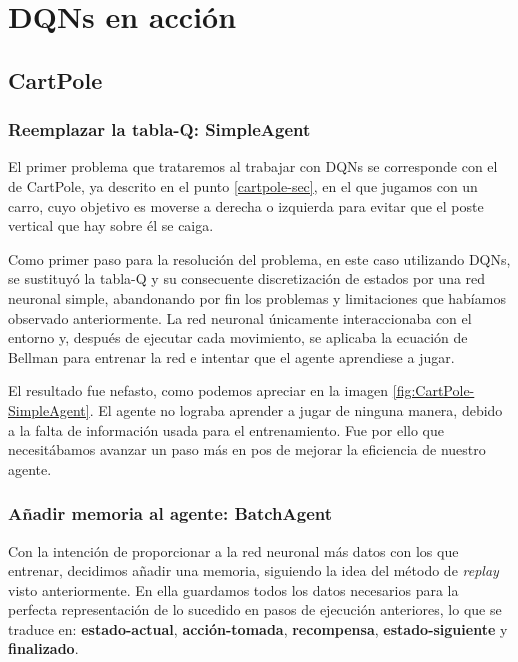 \chapter{DQNs en acción}
\label{cap:dqnEnAccion}


\section{CartPole}
\label{sec:cartpoleDQN}

\subsection{Reemplazar la tabla-Q: SimpleAgent}

El primer problema que trataremos al trabajar con DQNs se corresponde con el de CartPole, ya descrito en el punto \ref{cartpole-sec}, en el que jugamos con un carro, cuyo objetivo es moverse a derecha o izquierda para evitar que el poste vertical que hay sobre él se caiga.

Como primer paso para la resolución del problema, en este caso utilizando DQNs, se sustituyó la tabla-Q y su consecuente discretización de estados por una red neuronal simple, abandonando por fin los problemas y limitaciones que habíamos observado anteriormente. La red neuronal únicamente interaccionaba con el entorno y, después de ejecutar cada movimiento, se aplicaba la ecuación de Bellman para entrenar la red e intentar que el agente aprendiese a jugar.

El resultado fue nefasto, como podemos apreciar en la imagen \ref{fig:CartPole-SimpleAgent}. El agente no lograba aprender a jugar de ninguna manera, debido a la falta de información usada para el entrenamiento. Fue por ello que necesitábamos avanzar un paso más en pos de mejorar la eficiencia de nuestro agente.


\subsection{Añadir memoria al agente: BatchAgent}

Con la intención de proporcionar a la red neuronal más datos con los que entrenar, decidimos añadir una memoria, siguiendo la idea del método de \textit{replay} visto anteriormente. En ella guardamos todos los datos necesarios para la perfecta representación de lo sucedido en pasos de ejecución anteriores, lo que se traduce en: \textbf{estado-actual}, \textbf{acción-tomada}, \textbf{recompensa}, \textbf{estado-siguiente} y \textbf{finalizado}.

